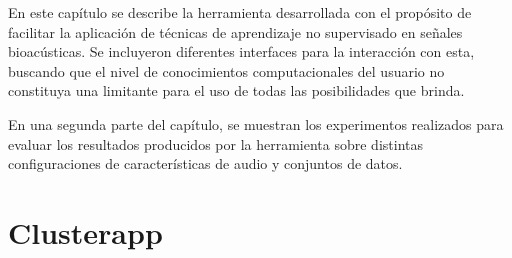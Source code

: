 En este capítulo se describe la herramienta desarrollada con el propósito de facilitar la aplicación de técnicas de aprendizaje no supervisado en señales bioacústicas.
Se incluyeron diferentes interfaces para la interacción con esta, buscando que el nivel de conocimientos computacionales del usuario no constituya una limitante para el uso de todas las posibilidades que brinda.

En una segunda parte del capítulo, se muestran los experimentos realizados para evaluar los resultados producidos por la herramienta sobre distintas configuraciones de características de audio y conjuntos de datos.

\section{Clusterapp}\label{sec:clusterapp}


